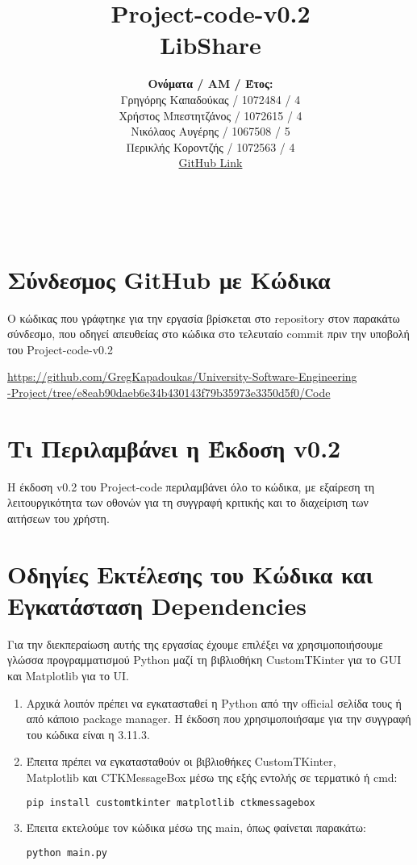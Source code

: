 \documentclass[12pt,a4paper]{article}
\title{Project-code-v0.2 \\ LibShare}
\author{\textbf{Ονόματα / ΑΜ / Έτος:} \\ Γρηγόρης Καπαδούκας / 1072484 / 4\textdegree \\ Χρήστος Μπεστητζάνος / 1072615 / 4\textdegree \\ Νικόλαος Αυγέρης / 1067508 / 5\textdegree \\ Περικλής Κοροντζής / 1072563 / 4\textdegree\\ \href{https://github.com/GregKapadoukas/University-Software-Engineering-Project}{\color{blue}GitHub Link}}
\begin{document}
\makeatletter
\begin{center}
	\LARGE{\@title} \\
	\pagebreak
    \begin{LARGE}\@author\end{LARGE}
    \pagebreak
\end{center}

\section{Σύνδεσμος GitHub με Κώδικα}
Ο κώδικας που γράφτηκε για την εργασία βρίσκεται στο repository στον παρακάτω σύνδεσμο, που οδηγεί απευθείας στο κώδικα στο τελευταίο commit πριν την υποβολή του Project-code-v0.2

\textcolor{blue}{\href{https://github.com/GregKapadoukas/University-Software-Engineering-Project/tree/e8eab90daeb6e34b430143f79b35973e3350d5f0/Code}{https://github.com/GregKapadoukas/University-Software-Engineering\\-Project/tree/e8eab90daeb6e34b430143f79b35973e3350d5f0/Code}}

\section{Τι Περιλαμβάνει η Έκδοση v0.2}

Η έκδοση v0.2 του Project-code περιλαμβάνει όλο το κώδικα, με εξαίρεση τη λειτουργικότητα των οθονών για τη συγγραφή κριτικής και το διαχείριση των αιτήσεων του χρήστη.

\section{Οδηγίες Εκτέλεσης του Κώδικα και Εγκατάσταση Dependencies}
Για την διεκπεραίωση αυτής της εργασίας έχουμε επιλέξει να χρησιμοποιήσουμε γλώσσα προγραμματισμού Python μαζί τη βιβλιοθήκη CustomTKinter για το GUI και Matplotlib για το UI.

\begin{enumerate}
    \item Αρχικά λοιπόν πρέπει να εγκατασταθεί η Python από την official σελίδα τους ή από κάποιο package manager. Η έκδοση που χρησιμοποιήσαμε για την συγγραφή του κώδικα είναι η 3.11.3.

    \item Έπειτα πρέπει να εγκατασταθούν οι βιβλιοθήκες CustomTKinter,\\Matplotlib και CTKMessageBox μέσω της εξής εντολής σε τερματικό ή cmd:

\begin{lstlisting}[language=Bash]
pip install customtkinter matplotlib ctkmessagebox\end{lstlisting}

    \item Έπειτα εκτελούμε τον κώδικα μέσω της main, όπως φαίνεται παρακάτω:

\begin{lstlisting}[language=Bash]
python main.py\end{lstlisting}
\end{enumerate}
\end{document}
